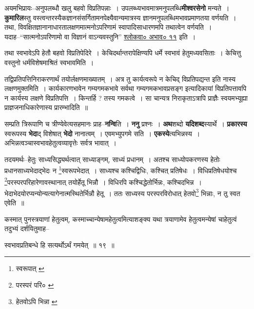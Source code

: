 \documentclass[article,12pt,a4paper]{memoir}
\begin{document}
	  \pstart अयमभिप्रायः--अनुपलब्धौ खलु बहवो विप्रतिपन्नाः । उपलब्ध्यभावमात्रमनुपलब्धि\textbf{मीश्वरसेनो} मन्यते । \textbf{कुमारिल}स्तु वस्त्वन्तरस्यैकज्ञानसंसर्गितामनपेक्ष्यैवान्यमात्रस्य ज्ञानमनुपलब्धिमभावप्रमाणतया वर्णयति । तथा, विवक्षितज्ञानानाधारतालक्षणमात्मनोऽपरिणामं स्वापादिसाधारणम\leavevmode{}पि तथात्वेन वर्णयति । यदाह--“सात्मनोऽपरिणामो वा विज्ञानं वाऽन्यवस्तुनि” \href{http://http://sarit.indology.info/?cref=śv.abhāva.11}{श्लोकवा० अभाव० ११} इति ।
	\pend
      

	  \pstart तथा स्वभावेऽपि हेतौ बहवो विप्रतिपेदिरे । केचिदर्थान्तरापेक्षिण्यपि धर्मे स्वभावं हेतुमध्यवसिताः । केचित्तु वस्तुनो धर्मविशेषमाश्रितं स्वभावमिति ।
	\pend
      

	  \pstart तद्विप्रतिपत्तिनिराकरणार्थं तयोर्लक्षणमाख्यातम् । अत्र तु कार्यत्वरूपे न केचिद् विप्रतिपद्यन्त इति नास्य लक्षणमुक्तमिति । कार्यकारणभावेन गम्यगमकभावे सर्वथा गम्यगमकभावप्रसङ्ग इत्यादिकायां विप्रतिपत्तावपि न कार्यस्य लक्षणे विप्रतिपत्ति । किन्तर्हि ? तस्य गमकत्वे । सा चान्यत्र निराकृताऽत्रापि प्राज्ञैः स्वयमभ्यूह्या प्राज्ञजनाधिकारेणास्य प्रारम्भादिति ॥
	\pend
      

	  \pstart सम्प्रति त्रिरूपाणि च त्रीण्येवेत्यसहमानः प्राह--\textbf{नन्वि}ति । \textbf{ननु} प्रश्नः । \textbf{अथ}शब्दो \textbf{यदिशब्द}स्यार्थे । \textbf{प्रकारस्य} स्वरूपस्य \textbf{भेदा}द् विशेषात् \textbf{भेदो} नानात्वम् । एवमभ्युपगमे सति । \textbf{एकस्ये}त्यभिन्नस्य । अभिन्नत्वञ्चास्वभावहेतुत्वव्यावृत्तेः सर्वत्र भावात् ।
	\pend
	  \bigskip
	  \begingroup
	

	  \pstart तदयमर्थः--हेतुः साध्यसिद्ध्यर्थत्वात् साध्याङ्गम्, साध्यं प्रधानम् । अतश्च साध्योपकरणस्य हेतोः प्रधानसाध्यभेदाद्भेदः न \footnote{स्वरूपात् \cite{dp-msC}}\-स्वरूपभेदात् । साध्यश्च कश्चिद्विधिः, कश्चित् प्रतिषेधः । विधिप्रतिषेधयोश्च \footnote{परस्परं परि० \cite{dp-msB} \cite{dp-msD}}\-परस्परपरिहारेणावस्थानात् तयोर्हेतू भिन्नौ । विधिरपि कश्चिद्धेतोर्भिन्नः, कश्चिदभिन्न । भेदाभेदयोरप्यन्योन्यत्यागेनात्मस्थितेर्भिन्नौ हेतू । ततः साध्यस्य परस्परविरोधात् हेतवो\footnote{हेतवोऽपि भिन्ना \cite{dp-msB}} भिन्नाः, न तु स्वत एवेति ॥
	\pend
       

	  \pstart कस्मात् पुनस्त्रयाणां हेतुत्वम्, कस्माच्चान्येषामहेतुत्वमित्याशङ्क्य यथा त्रयाणामेव हेतुत्वमन्येषां चाहेतुत्वं तदुभ्यं दर्शयितुमाह--
	\pend
      
	  \endgroup
	
	  \bigskip
	  \begingroup
	

	  \pstart स्वभावप्रतिबन्धे हि सत्यर्थोऽर्थं गमयेत् ॥ १९ ॥
	\pend
      
\end{document}
